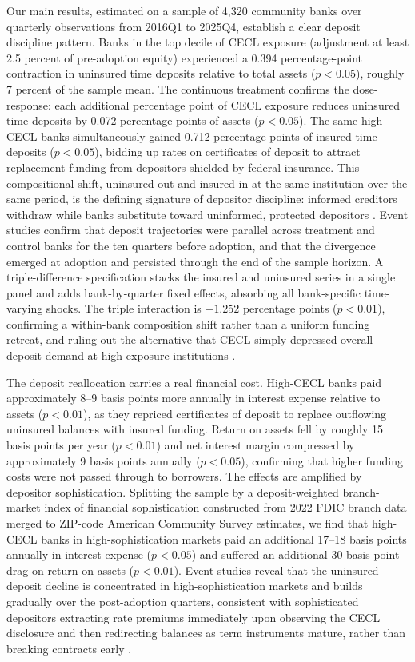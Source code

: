Our main results, estimated on a sample of 4,320 community banks over quarterly
observations from 2016Q1 to 2025Q4, establish a clear deposit discipline
pattern.  Banks in the top decile of CECL exposure (adjustment at least 2.5
percent of pre-adoption equity) experienced a 0.394 percentage-point contraction
in uninsured time deposits relative to total assets ($p < 0.05$), roughly 7
percent of the sample mean.  The continuous treatment confirms the dose-response:
each additional percentage point of CECL exposure reduces uninsured time deposits
by 0.072 percentage points of assets ($p < 0.05$).  The same high-CECL banks
simultaneously gained 0.712 percentage points of insured time deposits ($p <
0.05$), bidding up rates on certificates of deposit to attract replacement funding
from depositors shielded by federal insurance.  This compositional shift, uninsured
out and insured in at the same institution over the same period, is the defining
signature of depositor discipline: informed creditors withdraw while banks
substitute toward uninformed, protected depositors \citep{calomiris1991role}.
Event studies confirm that deposit trajectories were parallel across treatment and
control banks for the ten quarters before adoption, and that the divergence
emerged at adoption and persisted through the end of the sample horizon.  A
triple-difference specification stacks the insured and uninsured series in a
single panel and adds bank-by-quarter fixed effects, absorbing all bank-specific
time-varying shocks.  The triple interaction is $-1.252$ percentage points ($p <
0.01$), confirming a within-bank composition shift rather than a uniform funding
retreat, and ruling out the alternative that CECL simply depressed overall deposit
demand at high-exposure institutions \citep{chen2022bank}.

The deposit reallocation carries a real financial cost.  High-CECL banks paid
approximately 8--9 basis points more annually in interest expense relative to
assets ($p < 0.01$), as they repriced certificates of deposit to replace outflowing
uninsured balances with insured funding.  Return on assets fell by roughly 15
basis points per year ($p < 0.01$) and net interest margin compressed by
approximately 9 basis points annually ($p < 0.05$), confirming that higher
funding costs were not passed through to borrowers.  The effects are amplified
by depositor sophistication.  Splitting the sample by a deposit-weighted
branch-market index of financial sophistication constructed from 2022 FDIC branch
data merged to ZIP-code American Community Survey estimates, we find that high-CECL
banks in high-sophistication markets paid an additional 17--18 basis points
annually in interest expense ($p < 0.05$) and suffered an additional 30 basis
point drag on return on assets ($p < 0.01$).  Event studies reveal that the
uninsured deposit decline is concentrated in high-sophistication markets and builds
gradually over the post-adoption quarters, consistent with sophisticated depositors
extracting rate premiums immediately upon observing the CECL disclosure and then
redirecting balances as term instruments mature, rather than breaking contracts
early \citep{egan2017deposit, iyer2016tale}.

